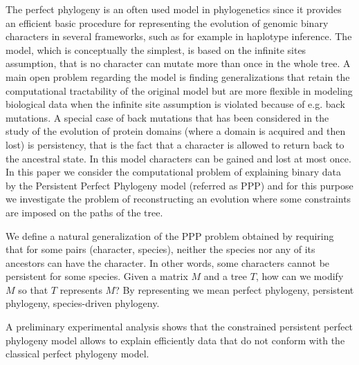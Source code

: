 
The   perfect phylogeny is an often used model in phylogenetics since it provides an efficient basic procedure for  representing the evolution of genomic binary characters in several frameworks, such  as for example in haplotype inference. The model, which is conceptually the  simplest, is based on the infinite sites
assumption, that is no character can mutate more than once in the whole tree. A
main open problem regarding the model is finding generalizations that retain the
computational  tractability of the original model but are more flexible in
modeling biological data when the infinite site assumption is violated because
of e.g. back mutations. A special case of back mutations that has been
considered in the study of the evolution of protein domains (where a domain is
acquired and then lost)  is persistency, that is the fact that a character is
allowed to return  back to the ancestral state.
In this model characters  can be  gained and lost at most once.
In this paper we consider the computational  problem of  explaining binary data by   the Persistent Perfect Phylogeny model
(referred as PPP) and for this purpose we investigate the problem of
reconstructing an evolution where some constraints are imposed on the paths of
the tree.


We define a  natural generalization of the PPP problem obtained by requiring
that for some pairs (character, species), neither the species nor any of its
ancestors can have the character. In other words, some characters cannot be persistent for some species.
Given a matrix $M$ and a tree $T$, how can we modify $M$ so that $T$ represents $M$?
By representing we mean perfect phylogeny, persistent phylogeny, species-driven phylogeny.

A preliminary experimental analysis shows that the
constrained persistent perfect phylogeny model allows to explain efficiently
data that do not conform with the classical perfect phylogeny model.

\begin{keyword}
\end{keyword}


